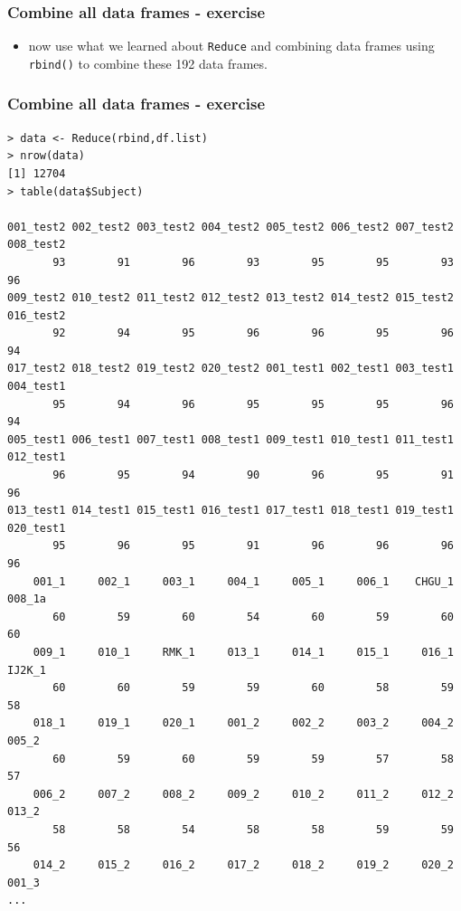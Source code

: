 \documentclass[xcolor={table},c]{beamer}
\begin{document}
\begin{frame}[fragile]\frametitle{Combine all data frames - exercise}
  \begin{itemize}
  \item now use what we learned about  \texttt{Reduce{}} and combining data frames using \texttt{rbind()}  to combine these 192 data frames. 

  \end{itemize}
\end{frame}

\begin{frame}[fragile]\frametitle{Combine all data frames - exercise}
\tiny
\begin{verbatim}
> data <- Reduce(rbind,df.list)
> nrow(data)
[1] 12704
> table(data$Subject)

001_test2 002_test2 003_test2 004_test2 005_test2 006_test2 007_test2 008_test2 
       93        91        96        93        95        95        93        96 
009_test2 010_test2 011_test2 012_test2 013_test2 014_test2 015_test2 016_test2 
       92        94        95        96        96        95        96        94 
017_test2 018_test2 019_test2 020_test2 001_test1 002_test1 003_test1 004_test1 
       95        94        96        95        95        95        96        94 
005_test1 006_test1 007_test1 008_test1 009_test1 010_test1 011_test1 012_test1 
       96        95        94        90        96        95        91        96 
013_test1 014_test1 015_test1 016_test1 017_test1 018_test1 019_test1 020_test1 
       95        96        95        91        96        96        96        96 
    001_1     002_1     003_1     004_1     005_1     006_1    CHGU_1    008_1a 
       60        59        60        54        60        59        60        60 
    009_1     010_1     RMK_1     013_1     014_1     015_1     016_1    IJ2K_1 
       60        60        59        59        60        58        59        58 
    018_1     019_1     020_1     001_2     002_2     003_2     004_2     005_2 
       60        59        60        59        59        57        58        57 
    006_2     007_2     008_2     009_2     010_2     011_2     012_2     013_2 
       58        58        54        58        58        59        59        56 
    014_2     015_2     016_2     017_2     018_2     019_2     020_2     001_3 
...
\end{verbatim}
\end{frame}
\end{document}
